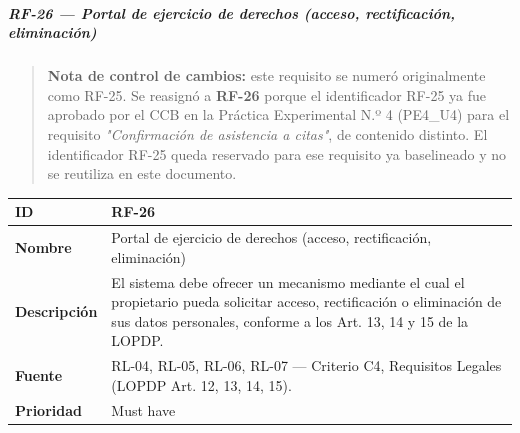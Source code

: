\subparagraph{RF-26 --- Portal de ejercicio de derechos (acceso,
rectificación,
eliminación)}\label{rf-26-portal-de-ejercicio-de-derechos}

\begin{quote}
\textbf{Nota de control de cambios:} este requisito se numeró
originalmente como RF-25. Se reasignó a \textbf{RF-26} porque el
identificador RF-25 ya fue aprobado por el CCB en la Práctica
Experimental N.º 4 (PE4\_U4) para el requisito \emph{"Confirmación de
asistencia a citas"}, de contenido distinto. El identificador RF-25
queda reservado para ese requisito ya baselineado y no se reutiliza en
este documento.
\end{quote}

{\def\LTcaptype{none} %
\begin{longtable}[]{@{}
  >{\raggedright\arraybackslash}p{}
  >{\raggedright\arraybackslash}p{}@{}}
\toprule\noalign{}
\begin{minipage}[b]{\linewidth}\raggedright
\textbf{ID}
\end{minipage} & \begin{minipage}[b]{\linewidth}\raggedright
RF-26
\end{minipage} \\
\midrule\noalign{}
\endhead
\bottomrule\noalign{}
\endlastfoot
\textbf{Nombre} & \begin{minipage}[t]{\linewidth}\raggedright
Portal de ejercicio de derechos (acceso, rectificación, eliminación)
\end{minipage} \\
\textbf{Descripción} & \begin{minipage}[t]{\linewidth}\raggedright
El sistema debe ofrecer un mecanismo mediante el cual el propietario
pueda solicitar acceso, rectificación o eliminación de sus datos
personales, conforme a los Art. 13, 14 y 15 de la LOPDP.
\end{minipage} \\
\textbf{Fuente} & \begin{minipage}[t]{\linewidth}\raggedright
RL-04, RL-05, RL-06, RL-07 --- Criterio C4, Requisitos Legales (LOPDP
Art. 12, 13, 14, 15).
\end{minipage} \\
\textbf{Prioridad} & \begin{minipage}[t]{\linewidth}\raggedright
Must have
\end{minipage} \\

\end{longtable}}
